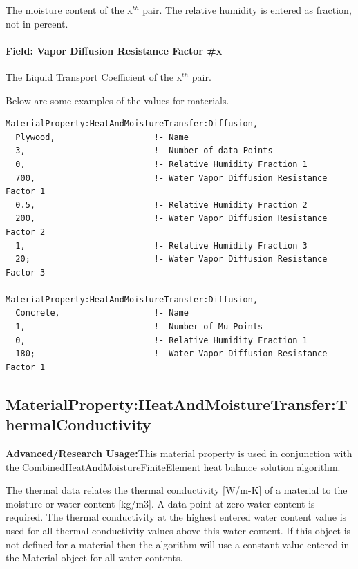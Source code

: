 The moisture content of the x\(^{th}\) pair. The relative humidity is entered as fraction, not in percent.

\paragraph{Field: Vapor Diffusion Resistance Factor \#x}\label{field-vapor-diffusion-resistance-factor-x}

The Liquid Transport Coefficient of the x\(^{th}\) pair.

Below are some examples of the values for materials.

\begin{lstlisting}
MaterialProperty:HeatAndMoistureTransfer:Diffusion,
  Plywood,                    !- Name
  3,                          !- Number of data Points
  0,                          !- Relative Humidity Fraction 1
  700,                        !- Water Vapor Diffusion Resistance Factor 1
  0.5,                        !- Relative Humidity Fraction 2
  200,                        !- Water Vapor Diffusion Resistance Factor 2
  1,                          !- Relative Humidity Fraction 3
  20;                         !- Water Vapor Diffusion Resistance Factor 3

MaterialProperty:HeatAndMoistureTransfer:Diffusion,
  Concrete,                   !- Name
  1,                          !- Number of Mu Points
  0,                          !- Relative Humidity Fraction 1
  180;                        !- Water Vapor Diffusion Resistance Factor 1
\end{lstlisting}

\subsection{MaterialProperty:HeatAndMoistureTransfer:ThermalConductivity}\label{materialpropertyheatandmoisturetransferthermalconductivity}

\textbf{Advanced/Research Usage:}This material property is used in conjunction with the CombinedHeatAndMoistureFiniteElement heat balance solution algorithm.

The thermal data relates the thermal conductivity {[}W/m-K{]} of a material to the moisture or water content {[}kg/m3{]}. A data point at zero water content is required. The thermal conductivity at the highest entered water content value is used for all thermal conductivity values above this water content. If this object is not defined for a material then the algorithm will use a constant value entered in the Material object for all water contents.

